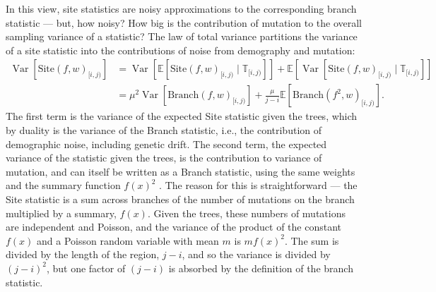 \documentclass[9pt,twoside,lineno]{gsajnl}
\newcommand{\E}{\mathbb{E}}
\newcommand{\var}{\mathop{\mbox{Var}}}
\newcommand{\branch}{\mbox{Branch}} %
\newcommand{\site}{\mbox{Site}} %
\newcommand{\given}{\;\vert\;}
\newcommand{\treeseq}{\mathbb{T}} %
\newcommand{\iw}{w} %
\begin{document}
In this view,
site statistics are noisy approximations to the corresponding branch statistic
--- but, how noisy?
How big is the contribution of mutation to the overall sampling variance of a statistic?
The law of total variance partitions the variance of a site statistic
into the contributions of noise from demography and mutation:
\begin{align*}
    \var[\site(f, \iw)_{[i,j)}]
    &=
        \var\left[ \E\left[\site(f, \iw)_{[i,j)} \given \treeseq_{[i,j)}\right] \right]
            +
        \E\left[ \var\left[\site(f, \iw)_{[i,j)} \given \treeseq_{[i,j)}\right] \right]
        \\
    &=
        \mu^2 \var\left[ \branch(f, \iw)_{[i,j)} \right]
            +
        \frac{\mu}{j-i} \E\left[ \branch(f^2, \iw)_{[i,j)} \right] .
\end{align*}
The first term is the variance of the expected Site statistic given the trees,
which by duality is the variance of the Branch statistic,
i.e., the contribution of demographic noise, including genetic drift.
The second term, the expected variance of the statistic given the trees,
is the contribution to variance of mutation,
and can itself be written as a Branch statistic,
using the same weights and the summary function $f(x)^2$
\citep[Lemma 2 in][]{ralph2019empirical}.
The reason for this is straightforward ---
the Site statistic is a sum across branches of the number of mutations on the branch
multiplied by a summary, $f(x)$.
Given the trees, these numbers of mutations are independent and Poisson,
and the variance of the product of the constant $f(x)$
and a Poisson random variable with mean $m$ is $m f(x)^2$.
The sum is divided by the length of the region, $j-i$,
and so the variance is divided by $(j-i)^2$,
but one factor of $(j-i)$ is absorbed by the definition of the branch statistic.
\end{document}
